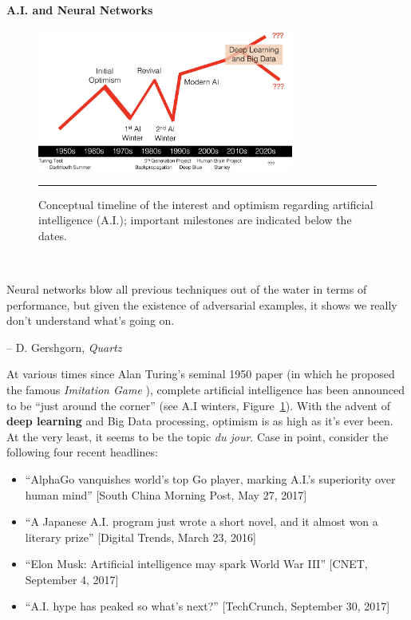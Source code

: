 \paragraph{A.I. and Neural Networks}
\begin{figure}[!t]
\centering
\includegraphics[width=0.75\textwidth]{images/DSML/AIDL1.png} \caption[\small A.I. Timeline (1950-20??)]{\small Conceptual timeline of the interest and optimism regarding artificial intelligence (A.I.); important milestones are indicated below the dates.}\hrule\label{fig:aidltimeline}
\end{figure}
\afterpage{\FloatBarrier}
\ \newline
\begin{tcolorbox}[title=Deep Learning Indeed]
Neural networks blow all previous techniques out of the water in terms of performance, but given the existence of adversarial examples, it shows we really don't understand what's going on.
 \\[-0.6cm]
\begin{flushright}
-- D. Gershgorn, \textit{Quartz}
\end{flushright}
\end{tcolorbox}
\noindent At various times since Alan Turing's seminal 1950 paper (in which he proposed the famous \textit{Imitation Game} \cite{DSML_AI9}), complete artificial intelligence has been announced to be ``just around the corner'' (see A.I winters, Figure~\ref{fig:aidltimeline}). With the advent of \textbf{deep learning} and Big Data processing, optimism is as high as it's ever been. At the very least, it seems to be the topic \textit{du jour}. Case in point, consider the following four recent headlines: 
\begin{itemize}[noitemsep]
\item ``AlphaGo vanquishes world's top Go player, marking A.I.'s superiority over human mind'' [South China Morning Post, May 27, 2017]
\item ``A Japanese A.I. program just wrote a short novel, and it almost won a literary prize'' [Digital Trends, March 23, 2016]
\item ``Elon Musk: Artificial intelligence may spark World War III'' [CNET, September 4, 2017]
\item ``A.I. hype has peaked so what's next?'' [TechCrunch, September 30, 2017]
\end{itemize}
